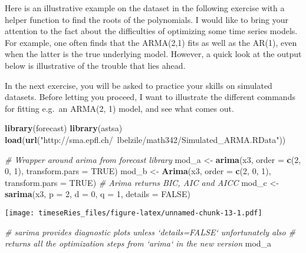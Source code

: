 \documentclass[]{book}
\newenvironment{Shaded}{\begin{snugshade}}{\end{snugshade}}
\newcommand{\CommentTok}[1]{\textcolor[rgb]{0.56,0.35,0.01}{\textit{#1}}}
\newcommand{\DataTypeTok}[1]{\textcolor[rgb]{0.13,0.29,0.53}{#1}}
\newcommand{\DecValTok}[1]{\textcolor[rgb]{0.00,0.00,0.81}{#1}}
\newcommand{\KeywordTok}[1]{\textcolor[rgb]{0.13,0.29,0.53}{\textbf{#1}}}
\newcommand{\NormalTok}[1]{#1}
\newcommand{\OtherTok}[1]{\textcolor[rgb]{0.56,0.35,0.01}{#1}}
\newcommand{\StringTok}[1]{\textcolor[rgb]{0.31,0.60,0.02}{#1}}
\begin{document}
Here is an illustrative example on the dataset in the following exercise
with a helper function to find the roots of the polynomials. I would
like to bring your attention to the fact about the difficulties of
optimizing some time series models. For example, one often finds that
the ARMA(2,1) fits as well as the AR(1), even when the latter is the
true underlying model. However, a quick look at the output below is
illustrative of the trouble that lies ahead.

In the next exercise, you will be asked to practice your skills on
simulated datasets. Before letting you proceed, I want to illustrate the
different commands for fitting e.g.~an ARMA(2, 1) model, and see what
comes out.

\begin{Shaded}
\begin{Highlighting}[]
\KeywordTok{library}\NormalTok{(forecast)}
\KeywordTok{library}\NormalTok{(astsa)}
\KeywordTok{load}\NormalTok{(}\KeywordTok{url}\NormalTok{(}\StringTok{"http://sma.epfl.ch/~lbelzile/math342/Simulated_ARMA.RData"}\NormalTok{))}

\CommentTok{# Wrapper around arima from forecast library}
\NormalTok{mod_a <-}\StringTok{ }\KeywordTok{arima}\NormalTok{(x3, }\DataTypeTok{order =} \KeywordTok{c}\NormalTok{(}\DecValTok{2}\NormalTok{, }\DecValTok{0}\NormalTok{, }\DecValTok{1}\NormalTok{), }\DataTypeTok{transform.pars =} \OtherTok{TRUE}\NormalTok{)}
\NormalTok{mod_b <-}\StringTok{ }\KeywordTok{Arima}\NormalTok{(x3, }\DataTypeTok{order =} \KeywordTok{c}\NormalTok{(}\DecValTok{2}\NormalTok{, }\DecValTok{0}\NormalTok{, }\DecValTok{1}\NormalTok{), }\DataTypeTok{transform.pars =} \OtherTok{TRUE}\NormalTok{)}
\CommentTok{# Arima returns BIC, AIC and AICC}
\NormalTok{mod_c <-}\StringTok{ }\KeywordTok{sarima}\NormalTok{(x3, }\DataTypeTok{p =} \DecValTok{2}\NormalTok{, }\DataTypeTok{d =} \DecValTok{0}\NormalTok{, }\DataTypeTok{q =} \DecValTok{1}\NormalTok{, }\DataTypeTok{details =} \OtherTok{FALSE}\NormalTok{)}
\end{Highlighting}
\end{Shaded}

\texttt{[image: timeseRies\_files/figure-latex/unnamed-chunk-13-1.pdf]}

\begin{Shaded}
\begin{Highlighting}[]
\CommentTok{# sarima provides diagnostic plots unless `details=FALSE` unfortunately also}
\CommentTok{# returns all the optimization steps from `arima` in the new version}
\NormalTok{mod_a}
\end{Highlighting}
\end{Shaded}
\end{document}
